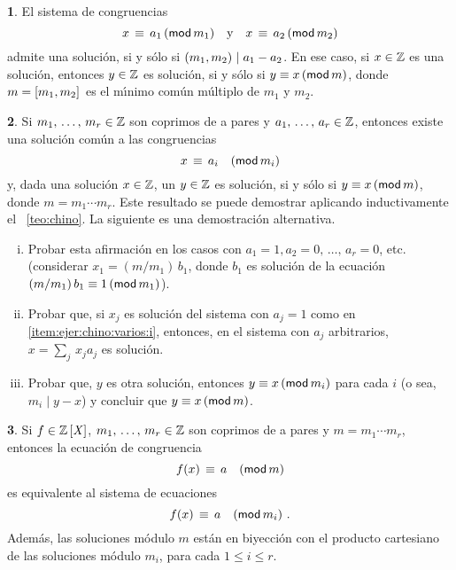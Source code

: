 \theoremstyle{definition}
\newtheorem{ejerChino}{\ejername}[section]


\begin{ejerChino}\label{ejer:chino}
	El sistema de congruencias
	\begin{displaymath}
		x\,\equiv\,a_1\tmodulo[m_1]\dispand
		x\,\equiv\,a_2\tmodulo[m_2]
	\end{displaymath}
	admite una soluci\'on, si y s\'olo si
	$\mcd{m_1,m_2}\mid a_1-a_2$.
	En ese caso, si $x\in\Enteros$ es una soluci\'on, entonces
	$y\in\Enteros$ es soluci\'on, si y s\'olo si
	$y\equiv x\tmodulo[m]$, donde $m=\mcm{m_1,m_2}$ es el
	m\'{\i}nimo com\'un m\'ultiplo de $m_1$ y $m_2$.
\end{ejerChino}

\begin{ejerChino}\label{ejer:chino:varios}
	Si $\lista m r\in\Enteros$ son coprimos de a pares y
	$\lista a r\in\Enteros$, entonces existe una soluci\'on
	com\'un a las congruencias
	\begin{displaymath}
		x\,\equiv\, a_i\modulo[m_i]
	\end{displaymath}
	y, dada una soluci\'on $x\in\Enteros$, un $y\in\Enteros$
	es soluci\'on, si y s\'olo si
	$y\equiv x\tmodulo[m]$, donde $m=m_1\cdots m_r$.
	Este resultado se puede demostrar aplicando inductivamente
	el \teoname~\ref{teo:chino}.
	La siguiente es una demostraci\'on alternativa.
	\begin{enumerate}[(i)]
		\item\label{item:ejer:chino:varios:i}
			Probar esta afirmaci\'on en los casos
			con $a_1=1,a_2=0,\,\dots,\,a_r=0$, etc.
			(considerar $x_1=(m/m_1)\,b_1$, donde
			$b_1$ es soluci\'on de la ecuaci\'on
			$(m/m_1)\,b_1\equiv 1\tmodulo[m_1]$).
		\item\label{item:ejer:chino:varios:ii}
			Probar que, si $x_j$ es soluci\'on
			del sistema con $a_j=1$ como en
			\eqref{item:ejer:chino:varios:i}, entonces,
			en el sistema con $a_j$ arbitrarios,
			$x=\sum_j\,x_ja_j$ es soluci\'on.
		\item\label{item:ejer:chino:varios:iii}
			Probar que, $y$ es otra soluci\'on,
			entonces $y\equiv x\tmodulo[m_i]$ para cada $i$
			(o sea, $m_i\mid y-x$)
			y concluir que $y\equiv x\tmodulo[m]$.
	\end{enumerate}
\end{ejerChino}

\begin{ejerChino}\label{ejer:chino:varios:coro}
	Si $f\in\polinomios\Enteros$, $\lista m r\in\Enteros$ son
	coprimos de a pares y $m=m_1\cdots m_r$,
	entonces la ecuaci\'on de congruencia
	\begin{displaymath}
		f(x)\,\equiv\,a\modulo[m]
	\end{displaymath}
	es equivalente al sistema de ecuaciones
	\begin{displaymath}
		f(x)\,\equiv\,a\modulo[m_i]
		\dispstop
	\end{displaymath}
	Adem\'as, las soluciones m\'odulo $m$ est\'an en biyecci\'on
	con el producto cartesiano de las soluciones m\'odulo
	$m_i$, para cada $1\leq i\leq r$.
\end{ejerChino}

